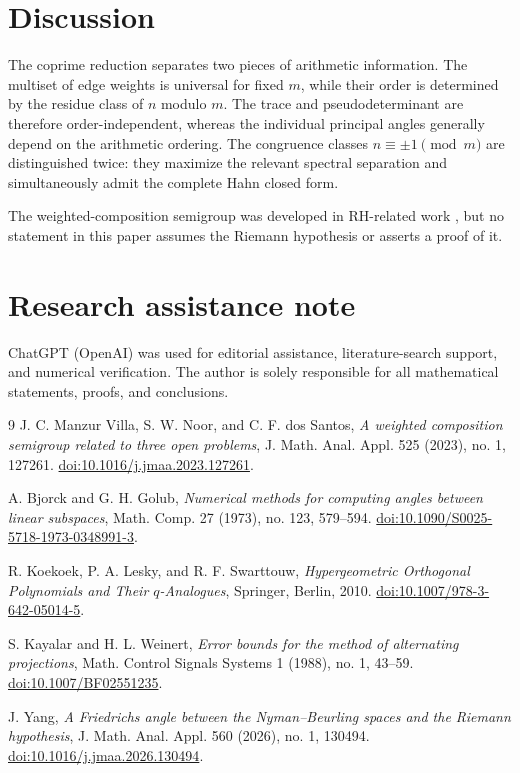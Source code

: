 \documentclass[11pt]{article}
\theoremstyle{remark}
\newcommand{\1}{\mathbf 1}
\begin{document}
\section{Discussion}
The coprime reduction separates two pieces of arithmetic information. The
multiset of edge weights is universal for fixed $m$, while their order is
determined by the residue class of $n$ modulo $m$. The trace and
pseudodeterminant are therefore order-independent, whereas the individual
principal angles generally depend on the arithmetic ordering. The
congruence classes $n\equiv\pm1\pmod m$ are distinguished twice: they
maximize the relevant spectral separation and simultaneously admit the
complete Hahn closed form.

The weighted-composition semigroup was developed in RH-related work
\cite{ManzurNoorSantos2023}, but no statement in this paper assumes the
Riemann hypothesis or asserts a proof of it.

\section*{Research assistance note}
ChatGPT (OpenAI) was used for editorial assistance, literature-search support,
and numerical verification. The author is solely responsible for all
mathematical statements, proofs, and conclusions.

\begin{thebibliography}{9}
J. C. Manzur Villa, S. W. Noor, and C. F. dos Santos,
\emph{A weighted composition semigroup related to three open problems},
J. Math. Anal. Appl. 525 (2023), no. 1, 127261.
\href{https://doi.org/10.1016/j.jmaa.2023.127261}{doi:10.1016/j.jmaa.2023.127261}.

A. Bjorck and G. H. Golub,
\emph{Numerical methods for computing angles between linear subspaces},
Math. Comp. 27 (1973), no. 123, 579--594.
\href{https://doi.org/10.1090/S0025-5718-1973-0348991-3}{doi:10.1090/S0025-5718-1973-0348991-3}.

R. Koekoek, P. A. Lesky, and R. F. Swarttouw,
\emph{Hypergeometric Orthogonal Polynomials and Their $q$-Analogues},
Springer, Berlin, 2010.
\href{https://doi.org/10.1007/978-3-642-05014-5}{doi:10.1007/978-3-642-05014-5}.

S. Kayalar and H. L. Weinert,
\emph{Error bounds for the method of alternating projections},
Math. Control Signals Systems 1 (1988), no. 1, 43--59.
\href{https://doi.org/10.1007/BF02551235}{doi:10.1007/BF02551235}.

J. Yang,
\emph{A Friedrichs angle between the Nyman--Beurling spaces and the Riemann hypothesis},
J. Math. Anal. Appl. 560 (2026), no. 1, 130494.
\href{https://doi.org/10.1016/j.jmaa.2026.130494}{doi:10.1016/j.jmaa.2026.130494}.
\end{thebibliography}
\end{document}
